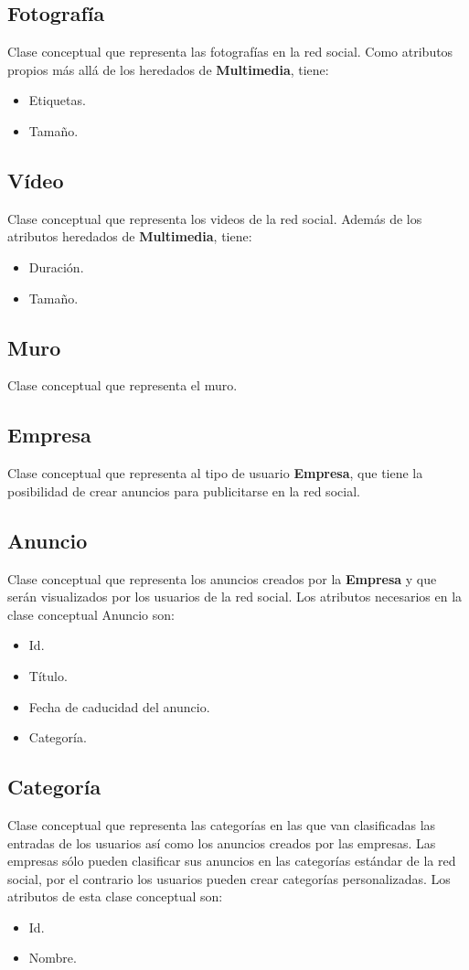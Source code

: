 \documentclass[12pt, a4paper, titlepage]{article}
\begin{document}
\subsection{Fotografía}
	Clase conceptual que representa las fotografías en la red social. Como atributos propios más allá de los heredados de \textbf{Multimedia}, tiene:
	\begin{itemize}
		\item Etiquetas.
		\item Tamaño.
	\end{itemize}
\subsection{Vídeo}
	Clase conceptual que representa los videos de la red social. Además de los atributos heredados de \textbf{Multimedia}, tiene:
	\begin{itemize}
		\item Duración.
		\item Tamaño.
	\end{itemize}
\subsection{Muro}
	Clase conceptual que representa el muro.
\subsection{Empresa}
	Clase conceptual que representa al tipo de usuario \textbf{Empresa}, que tiene la posibilidad de crear anuncios para publicitarse en la red social.
\subsection{Anuncio}
	Clase conceptual que representa los anuncios creados por la \textbf{Empresa} y que serán visualizados por los usuarios de la red social. Los atributos necesarios en la clase conceptual Anuncio son:
	\begin{itemize}
		\item Id.
		\item Título.
		\item Fecha de caducidad del anuncio.
		\item Categoría.
	\end{itemize}
\subsection{Categoría}
	Clase conceptual que representa las categorías en las que van clasificadas las entradas de los usuarios así como los anuncios creados por las empresas. Las empresas sólo pueden clasificar sus anuncios en las categorías estándar de la red social, por el contrario los usuarios pueden crear categorías personalizadas.
	Los atributos de esta clase conceptual son:
	\begin{itemize}
		\item Id.
		\item Nombre.
	\end{itemize}
\end{document}

